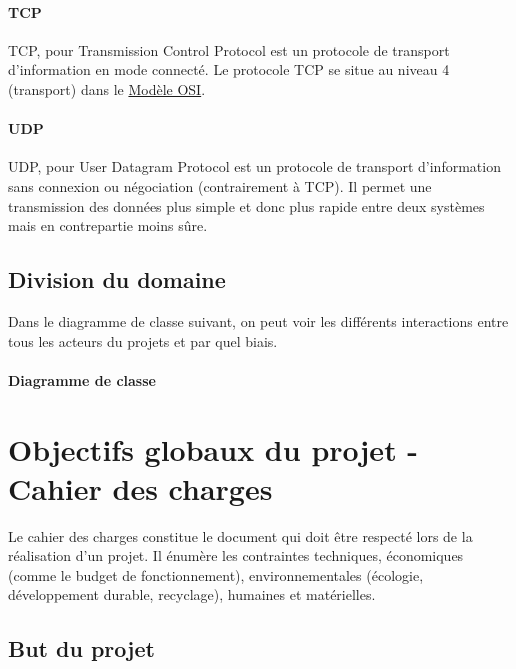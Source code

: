 \documentclass[french]{article}
\begin{document}
\paragraph{TCP}

TCP, pour Transmission Control Protocol est un protocole de transport d'information en mode connecté.
Le protocole TCP se situe au niveau 4 (transport) dans le \hyperlink{modele_osi}{Modèle OSI}.

\paragraph{UDP}

UDP, pour User Datagram Protocol est un protocole de transport d'information sans connexion ou négociation (contrairement à TCP).
Il permet une transmission des données plus simple et donc plus rapide entre deux systèmes mais en contrepartie moins sûre.


\subsection{Division du domaine}

Dans le diagramme de classe suivant, on peut voir les différents interactions entre tous les acteurs du projets et par quel biais.

\paragraph{Diagramme de classe}



\newpage
\section{Objectifs globaux du projet - Cahier des charges}

Le cahier des charges constitue le document qui doit être respecté lors de la réalisation d'un projet. Il énumère les contraintes techniques, économiques (comme le budget de fonctionnement), environnementales (écologie, développement durable, recyclage), humaines et matérielles.

\subsection{But du projet}
\end{document}
